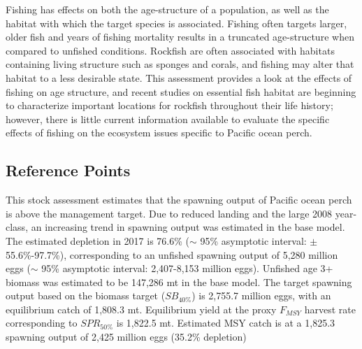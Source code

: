 \documentclass[12pt,]{article}
\begin{document}
Fishing has effects on both the age-structure of a population, as well
as the habitat with which the target species is associated. Fishing
often targets larger, older fish and years of fishing mortality results
in a truncated age-structure when compared to unfished conditions.
Rockfish are often associated with habitats containing living structure
such as sponges and corals, and fishing may alter that habitat to a less
desirable state. This assessment provides a look at the effects of
fishing on age structure, and recent studies on essential fish habitat
are beginning to characterize important locations for rockfish
throughout their life history; however, there is little current
information available to evaluate the specific effects of fishing on the
ecosystem issues specific to Pacific ocean perch.

\subsection*{Reference Points}\label{reference-points}

This stock assessment estimates that the spawning output of Pacific
ocean perch is above the management target. Due to reduced landing and
the large 2008 year-class, an increasing trend in spawning output was
estimated in the base model. The estimated depletion in 2017 is 76.6\%
(\(\sim\) 95\% asymptotic interval: \(\pm\) 55.6\%-97.7\%),
corresponding to an unfished spawning output of 5,280 million eggs
(\(\sim\) 95\% asymptotic interval: 2,407-8,153 million eggs). Unfished
age 3+ biomass was estimated to be 147,286 mt in the base model. The
target spawning output based on the biomass target (\(SB_{40\%}\)) is
2,755.7 million eggs, with an equilibrium catch of 1,808.3 mt.
Equilibrium yield at the proxy \(F_{MSY}\) harvest rate corresponding to
\(SPR_{50\%}\) is 1,822.5 mt. Estimated MSY catch is at a 1,825.3
spawning output of 2,425 million eggs (35.2\% depletion)
\end{document}
